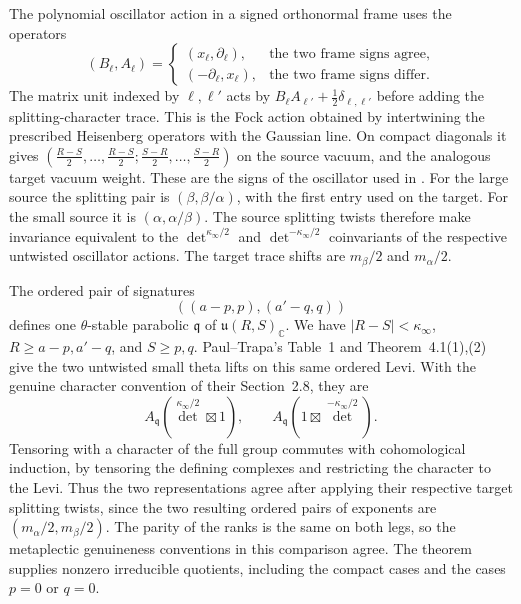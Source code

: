 The polynomial oscillator action in a signed orthonormal frame
uses the operators
\[
 (B_\ell,A_\ell)=
 \begin{cases}
 (x_\ell,\partial_\ell),&\text{the two frame signs agree},\\
 (-\partial_\ell,x_\ell),&\text{the two frame signs differ}.
 \end{cases}
\]
The matrix unit indexed by \(\ell,\ell'\) acts by
\(B_\ell A_{\ell'}+\tfrac12\delta_{\ell,\ell'}\)
before adding the splitting-character trace. This is the Fock
action obtained by intertwining the prescribed Heisenberg
operators with the Gaussian line. On compact diagonals it gives
\((\tfrac{R-S}{2},\ldots,\tfrac{R-S}{2};
  \tfrac{S-R}{2},\ldots,\tfrac{S-R}{2})\) on the source vacuum,
and the analogous target vacuum weight. These are the signs of
the oscillator used in \cite[(3.3)--(3.4)]{paul-trapa-characters}.
For the large source the splitting pair is
\((\beta,\beta/\alpha)\), with the first entry used on the
target. For the small source it is
\((\alpha,\alpha/\beta)\). The source splitting twists therefore
make invariance equivalent to the \(\det^{\kappa_\infty/2}\) and
\(\det^{-\kappa_\infty/2}\) coinvariants of the respective untwisted
oscillator actions. The target trace shifts are
\(m_\beta/2\) and \(m_\alpha/2\).

The ordered pair of signatures
\[
 ((a-p,p),(a'-q,q))
\]
defines one \(\theta\)-stable parabolic \(\mathfrak q\) of
\(\mathfrak u(R,S)_{\mathbb C}\).
We have \(\lvert R-S\rvert<\kappa_\infty\), \(R\ge a-p,a'-q\), and
\(S\ge p,q\). Paul--Trapa's Table~1 and Theorem~4.1(1),(2)
give the two untwisted small theta lifts on this same ordered
Levi. With the genuine character convention of their
Section~2.8, they are
\[
 A_{\mathfrak q}(\det^{\kappa_\infty/2}\boxtimes 1),\qquad
 A_{\mathfrak q}(1\boxtimes\det^{-\kappa_\infty/2}).
\]
Tensoring with a character of the full group commutes with
cohomological induction, by tensoring the defining complexes
and restricting the character to the Levi. Thus the two
representations agree after applying their respective target
splitting twists, since the two resulting ordered pairs of
exponents are \((m_\alpha/2,m_\beta/2)\).
The parity of the ranks is the same on both legs, so the
metaplectic genuineness conventions in this comparison agree.
The theorem supplies nonzero irreducible quotients, including
the compact cases and the cases \(p=0\) or \(q=0\).
\cite[\S2.8, Table~1 and Theorem~4.1(1),(2)]{paul-trapa-characters}

